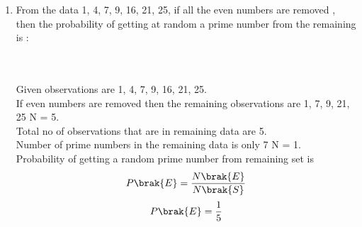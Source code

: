 \begin{enumerate}[label=\thesubsection.\arabic*, ref=\thesubsection.\theenumi]
 From \eqref{eq:EE26BTECH11211_Prob_1.4.10}
\begin{align}m\brak{sec\theta + tan\theta} = 1
\end{align}
 \begin{align}sec\theta + tan\theta = \frac{1}{m}
 \end{align}
 
\item
From the data 1, 4, 7, 9, 16, 21, 25, if all the even numbers are removed , then the probability of getting at random a prime number from the remaining is :
\begin{enumerate}
\end{enumerate}
\solution
\\\\ Given observations are 1, 4, 7, 9, 16, 21, 25.
\\If even numbers are removed then the remaining observations are {1, 7, 9, 21, 25} N = 5.
\\Total no of observations that are in remaining data are 5.
\\Number of prime numbers in the remaining data is only {7} N = 1.
\\Probability of getting a random prime number from remaining set is
 \begin{align}
 P\brak{E} = \frac{N\brak{E}}{N\brak{S}}
\end{align}
\begin{align}P\brak{E} = \frac{1}{5}
\end{align}


\end{enumerate}

